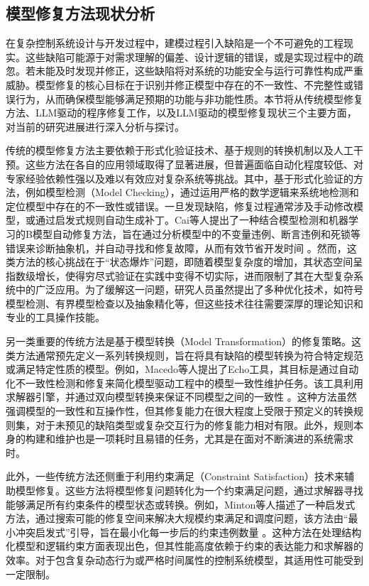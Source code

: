 \subsection{模型修复方法现状分析}

在复杂控制系统设计与开发过程中，建模过程引入缺陷是一个不可避免的工程现实。这些缺陷可能源于对需求理解的偏差、设计逻辑的错误，或是实现过程中的疏忽。若未能及时发现并修正，这些缺陷将对系统的功能安全与运行可靠性构成严重威胁。模型修复的核心目标在于识别并修正模型中存在的不一致性、不完整性或错误行为，从而确保模型能够满足预期的功能与非功能性质。本节将从传统模型修复方法、LLM驱动的程序修复工作，以及LLM驱动的模型修复现状三个主要方面，对当前的研究进展进行深入分析与探讨。

传统的模型修复方法主要依赖于形式化验证技术、基于规则的转换机制以及人工干预。这些方法在各自的应用领域取得了显著进展，但普遍面临自动化程度较低、对专家经验依赖性强以及难以有效应对复杂系统等挑战。其中，基于形式化验证的方法，例如模型检测（Model Checking），通过运用严格的数学逻辑来系统地检测和定位模型中存在的不一致性或错误。一旦发现缺陷，修复过程通常涉及手动修改模型，或通过启发式规则自动生成补丁。Cai等人提出了一种结合模型检测和机器学习的B模型自动修复方法，旨在通过分析模型中的不变量违例、断言违例和死锁等错误来诊断抽象机，并自动寻找和修复故障，从而有效节省开发时间 。然而，这类方法的核心挑战在于“状态爆炸”问题，即随着模型复杂度的增加，其状态空间呈指数级增长，使得穷尽式验证在实践中变得不切实际，进而限制了其在大型复杂系统中的广泛应用。为了缓解这一问题，研究人员虽然提出了多种优化技术，如符号模型检测、有界模型检查以及抽象精化等，但这些技术往往需要深厚的理论知识和专业的工具操作技能。

另一类重要的传统方法是基于模型转换（Model Transformation）的修复策略。这类方法通常预先定义一系列转换规则，旨在将具有缺陷的模型转换为符合特定规范或满足特定性质的模型。例如，Macedo等人提出了Echo工具，其目标是通过自动化不一致性检测和修复来简化模型驱动工程中的模型一致性维护任务。该工具利用求解器引擎，并通过双向模型转换来保证不同模型之间的一致性 。这种方法虽然强调模型的一致性和互操作性，但其修复能力在很大程度上受限于预定义的转换规则集，对于未预见的缺陷类型或复杂交互行为的修复能力相对有限。此外，规则本身的构建和维护也是一项耗时且易错的任务，尤其是在面对不断演进的系统需求时。

此外，一些传统方法还侧重于利用约束满足（Constraint Satisfaction）技术来辅助模型修复。这些方法将模型修复问题转化为一个约束满足问题，通过求解器寻找能够满足所有约束条件的模型状态或转换。例如，Minton等人描述了一种启发式方法，通过搜索可能的修复空间来解决大规模约束满足和调度问题，该方法由“最小冲突启发式”引导，旨在最小化每一步后的约束违例数量 。这种方法在处理结构化模型和逻辑约束方面表现出色，但其性能高度依赖于约束的表达能力和求解器的效率。对于包含复杂动态行为或严格时间属性的控制系统模型，其适用性可能受到一定限制。

